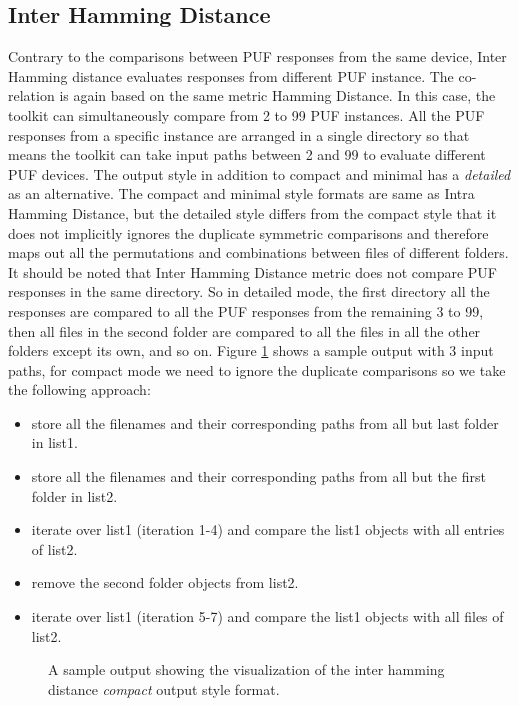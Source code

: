 \subsection{Inter Hamming Distance}
\label{inter_hd_section}
Contrary to the comparisons between PUF responses from the same device, Inter Hamming distance evaluates responses from different PUF instance. The co-relation is again based on the same metric Hamming Distance. In this case, the toolkit can simultaneously compare from 2 to 99 PUF instances. All the PUF responses from a specific instance are arranged in a single directory so that means the toolkit can take input paths between 2 and 99 to evaluate different PUF devices. The output
style in addition to compact and minimal has a \emph{detailed} as an alternative. The compact and minimal style formats are same as Intra Hamming Distance, but the detailed style differs from the compact style that it does not implicitly ignores the duplicate symmetric comparisons and therefore maps out all the permutations and combinations between files of different folders. It should be noted that Inter Hamming Distance metric does not compare PUF responses in the same directory. So
in detailed mode, the first directory all the responses are compared to all the PUF responses from the remaining 3 to 99, then all files in the second folder are compared to all the files in all the other folders except its own, and so on. Figure \ref{img:inter_output} shows a sample output with 3 input paths, for compact mode we need to ignore the duplicate comparisons so we take the following approach:
\begin{itemize}
	\item store all the filenames and their corresponding paths from all but last folder in list1.
	\item store all the filenames and their corresponding paths from all but the first folder in list2.
	\item iterate over list1 (iteration 1-4) and compare the list1 objects with all entries of list2.
	\item remove the second folder objects from list2.
	\item iterate over list1 (iteration 5-7) and compare the list1 objects with all files of list2.
\end{itemize}

\begin{figure}
\centering
{}
\caption{A sample output showing the visualization of the inter hamming distance \emph{compact} output style format.}
\label{img:inter_output}
\end{figure}

